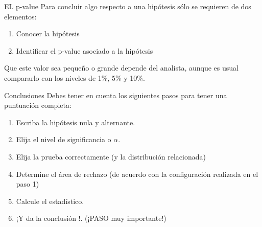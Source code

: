 \begin{frame}{EL p-value}
	Para concluir algo respecto a una hipótesis sólo se requieren de dos elementos:
		\begin{enumerate}
			\item Conocer la hipótesis
			\item Identificar el p-value asociado a la hipótesis
		\end{enumerate}
	Que este valor sea pequeño o grande depende del analista, aunque es usual compararlo con los niveles de 1\%, 5\% y 10\%.
\end{frame}
\begin{frame}{Conclusiones}
	Debes tener en cuenta los siguientes pasos para tener una puntuación completa:
		\begin{enumerate}
			\item Escriba la hipótesis nula y alternante.
			\item Elija el nivel de significancia o $\alpha$.
			\item Elija la prueba correctamente (y la distribución relacionada)
			\item Determine el área de rechazo (de acuerdo con la configuración realizada en el paso 1)
			\item Calcule el estadístico.
			\item ¡Y da la conclusión !. (¡PASO muy importante!)
		\end{enumerate}
\end{frame}

